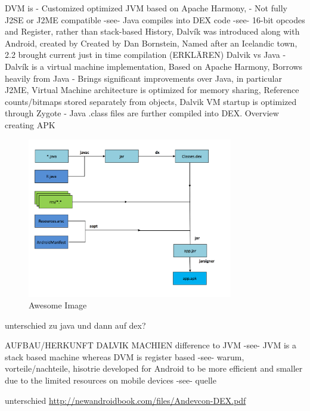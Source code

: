 %
DVM is
- Customized optimized JVM based on Apache Harmony,
- Not fully J2SE or J2ME compatible -see- Java compiles into DEX code -see- 16-bit opcodes and Register, rather than stack-based\newline
History, Dalvík was introduced along with Android, created by Created by Dan Bornstein, Named after an Icelandic town, 2.2 brought current just in time compilation (ERKLÄREN)\newline
Dalvik vs Java
- Dalvík is a virtual machine implementation, Based on Apache Harmony, Borrows heavily from Java
- Brings significant improvements over Java, in particular J2ME, Virtual Machine architecture is optimized for memory sharing, Reference counts/bitmaps stored separately from objects, Dalvik VM startup is optimized through Zygote
- Java .class files are further compiled into DEX.\newline
Overview creating APK
\begin{figure}[h]
    \centering
    \includegraphics[width=0.8\textwidth]{data/apk.png}
    \caption{Awesome Image}
    \label{fig:awesome_image}
\end{figure}
unterschied zu java und dann auf dex?\newline
\cite{andevconDalvikART}
%



AUFBAU/HERKUNFT DALVIK MACHIEN\newline
difference to JVM -see- JVM is a stack based machine whereas DVM is register based -see- warum, vorteile/nachteile, hisotrie\newline
developed for Android to be more efficient and smaller due to the limited resources on mobile devices -see- quelle\newline

unterschied \url{http://newandroidbook.com/files/Andevcon-DEX.pdf}\newline
